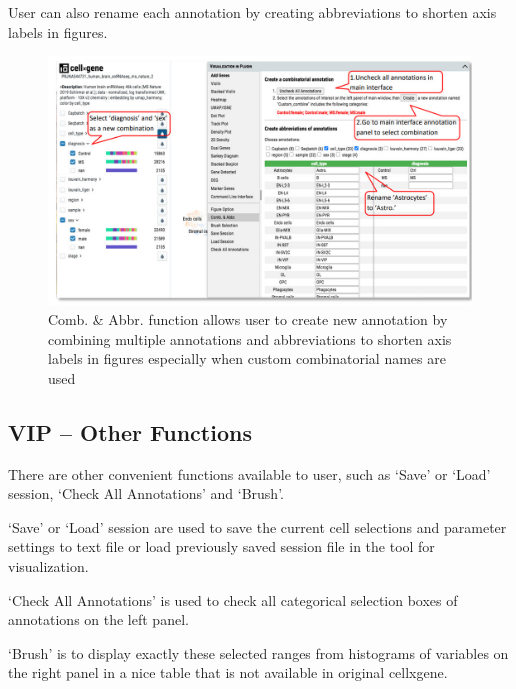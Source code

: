 \documentclass[
]{article}
\begin{document}
User can also rename each annotation by creating abbreviations to shorten axis labels in figures.

\begin{figure}
\centering
\includegraphics{figures/F22.jpg}
\caption{Comb. \& Abbr. function allows user to create new annotation by combining multiple annotations and abbreviations to shorten axis labels in figures especially when custom combinatorial names are used}
\end{figure}

\hypertarget{vip-other-functions}{%
\subsection{VIP -- Other Functions}\label{vip-other-functions}}

There are other convenient functions available to user, such as `Save' or `Load' session, `Check All Annotations' and `Brush'.

`Save' or `Load' session are used to save the current cell selections and parameter settings to text file or load previously saved session file in the tool for visualization.

`Check All Annotations' is used to check all categorical selection boxes of annotations on the left panel.

`Brush' is to display exactly these selected ranges from histograms of variables on the right panel in a nice table that is not available in original cellxgene.
\end{document}
